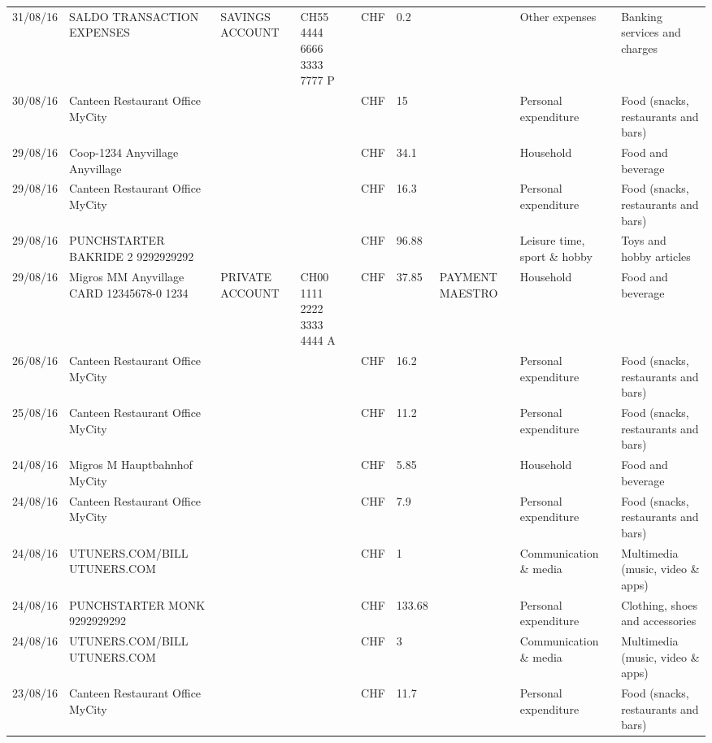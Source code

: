 \begin{landscape}
\begin{table}[t]
\begin{center}
\begin{tabular}{lllllllll}
		31/08/16 & SALDO TRANSACTION EXPENSES & SAVINGS ACCOUNT & CH55 4444 6666 3333 7777 P & CHF   & 0.2   &       & Other expenses & Banking services and charges \\
		30/08/16 & Canteen Restaurant Office      MyCity &       &       & CHF   & 15    &       & Personal expenditure & Food (snacks, restaurants and bars) \\
		29/08/16 & Coop-1234 Anyvillage    Anyvillage &       &       & CHF   & 34.1  &       & Household & Food and beverage \\
		29/08/16 & Canteen Restaurant Office      MyCity &       &       & CHF   & 16.3  &       & Personal expenditure & Food (snacks, restaurants and bars) \\
		29/08/16 & PUNCHSTARTER BAKRIDE 2   9292929292 &       &       & CHF   & 96.88 &       & Leisure time, sport \& hobby & Toys and hobby articles \\
		29/08/16 & Migros MM Anyvillage CARD 12345678-0 1234 & PRIVATE ACCOUNT & CH00 1111 2222 3333 4444 A & CHF   & 37.85 & PAYMENT MAESTRO & Household & Food and beverage \\
		26/08/16 & Canteen Restaurant Office      MyCity &       &       & CHF   & 16.2  &       & Personal expenditure & Food (snacks, restaurants and bars) \\
		25/08/16 & Canteen Restaurant Office      MyCity &       &       & CHF   & 11.2  &       & Personal expenditure & Food (snacks, restaurants and bars) \\
		24/08/16 & Migros M Hauptbahnhof    MyCity &       &       & CHF   & 5.85  &       & Household & Food and beverage \\
		24/08/16 & Canteen Restaurant Office      MyCity &       &       & CHF   & 7.9   &       & Personal expenditure & Food (snacks, restaurants and bars) \\
		24/08/16 & UTUNERS.COM/BILL          UTUNERS.COM &       &       & CHF   & 1     &       & Communication \& media & Multimedia (music, video \& apps) \\
		24/08/16 & PUNCHSTARTER MONK   9292929292 &       &       & CHF   & 133.68 &       & Personal expenditure & Clothing, shoes and accessories \\
		24/08/16 & UTUNERS.COM/BILL          UTUNERS.COM &       &       & CHF   & 3     &       & Communication \& media & Multimedia (music, video \& apps) \\
		23/08/16 & Canteen Restaurant Office      MyCity &       &       & CHF   & 11.7  &       & Personal expenditure & Food (snacks, restaurants and bars) \\

\end{tabular}
\end{center}
\end{table}
\end{landscape}
